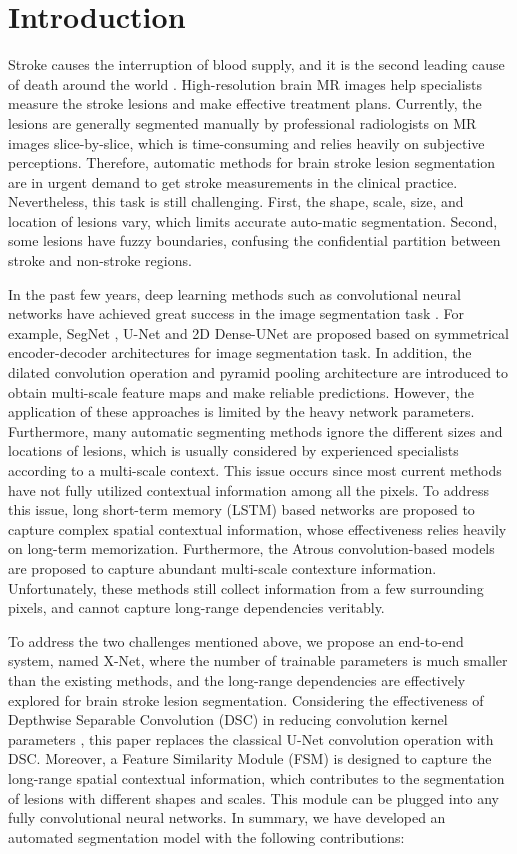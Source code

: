 \documentclass[runningheads]{llncs}
\begin{document}
\section{Introduction}
Stroke causes the interruption of blood supply, and it is the second leading cause of death around the world \cite{[1]}. High-resolution brain MR images help specialists measure the stroke lesions and make effective treatment plans. Currently, the lesions are generally segmented manually by professional radiologists on MR images slice-by-slice, which is time-consuming and relies heavily on subjective perceptions. Therefore, automatic methods for brain stroke lesion segmentation are in urgent demand to get stroke measurements in the clinical practice. Nevertheless, this task is still challenging. First, the shape, scale, size, and location of lesions vary, which limits accurate auto-matic segmentation. Second, some lesions have fuzzy boundaries, confusing the confidential partition between stroke and non-stroke regions.

In the past few years, deep learning methods such as convolutional neural networks have achieved great success in the image segmentation task \cite{[3],[24]}. For example, SegNet \cite{[4]}, U-Net \cite{[5]} and 2D Dense-UNet \cite{[6]} are proposed based on symmetrical encoder-decoder architectures for image segmentation task. In addition, the dilated convolution operation \cite{[21]} and pyramid pooling architecture \cite{[22]} are introduced to obtain multi-scale feature maps and make reliable predictions. However, the application of these approaches is limited by the heavy network parameters. Furthermore, many automatic segmenting methods ignore the different sizes and locations of lesions, which is usually considered by experienced specialists according to a multi-scale context. This issue occurs since most current methods have not fully utilized contextual information among all the pixels. To address this issue, long short-term memory (LSTM) based networks \cite{[9]} are proposed to capture complex spatial contextual information, whose effectiveness relies heavily on long-term memorization. Furthermore, the Atrous convolution-based models \cite{[10],[11],[12]} are proposed to capture abundant multi-scale contexture information. Unfortunately, these methods still collect information from a few surrounding pixels, and cannot capture long-range dependencies veritably.

To address the two challenges mentioned above, we propose an end-to-end system, named X-Net, where the number of trainable parameters is much smaller than the existing methods, and the long-range dependencies are effectively explored for brain stroke lesion segmentation. Considering the effectiveness of Depthwise Separable Convolution (DSC) in reducing convolution kernel parameters \cite{[13],[14]}, this paper replaces the classical U-Net convolution operation with DSC. Moreover, a Feature Similarity Module (FSM) is designed to capture the long-range spatial contextual information, which contributes to the segmentation of lesions with different shapes and scales. This module can be plugged into any fully convolutional neural networks. In summary, we have developed an automated segmentation model with the following contributions:
\end{document}

